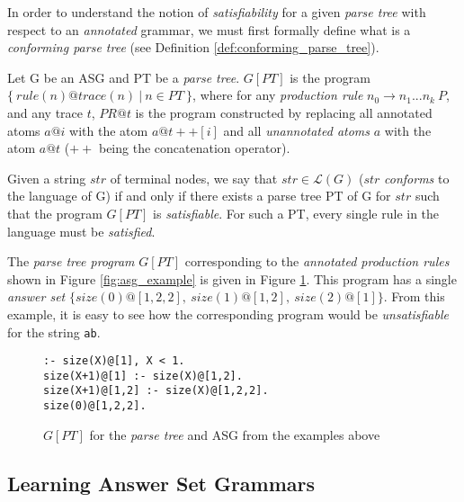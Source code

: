 \noindent
In order to understand the notion of \textit{satisfiability} for a given \textit{parse tree} with respect to an \textit{annotated} grammar, we must first formally define what is a \textit{conforming parse tree} (see Definition \ref{def:conforming_parse_tree}).

\begin{definition}
Let G be an ASG and PT be a \textit{parse tree}. $G[PT]$ is the program $\{\ rule(n)@trace(n)\ |\ n \in PT\ \}$, where for any \textit{production rule} $n_0 \to n_1...n_k\ P$, and any trace $t$, $PR@t$ is the program constructed by replacing all annotated atoms $a@i$ with the atom $a@t++[i]$ and all \textit{unannotated atoms} $a$ with the atom $a@t$ ($++$ being the concatenation operator).
\end{definition}

\begin{definition}
\label{def:conforming_parse_tree}
Given a string $str$ of terminal nodes, we say that $str \in \mathcal{L}(G)$ ($str$ \textit{conforms} to the language of G) if and only if there exists a parse tree PT of G for $str$ such that the program $G[PT]$ is \textit{satisfiable}. For such a PT, every single rule in the language must be \textit{satisfied}.
\end{definition}

\noindent
The \textit{parse tree program} $G[PT]$ corresponding to the \textit{annotated production rules} shown in Figure \ref{fig:asg_example} is given in Figure \ref{fig:asg_tree_program_example}. This program has a single \textit{answer set} $\{size(0)@[1,2,2],\ size(1)@[1,2],\ size(2)@[1]\}$. From this example, it is easy to see how the corresponding program would be \textit{unsatisfiable} for the string \texttt{ab}.

\begin{figure}[H]
\centering
\texttt{:- size(X)@[1], X < 1. \\
           size(X+1)@[1] :- size(X)@[1,2]. \\
           size(X+1)@[1,2] :- size(X)@[1,2,2]. \\
           size(0)@[1,2,2].}
\caption{$G[PT]$ for the \textit{parse tree} and ASG from the examples above}
\label{fig:asg_tree_program_example}
\end{figure}

\subsection*{Learning Answer Set Grammars}

